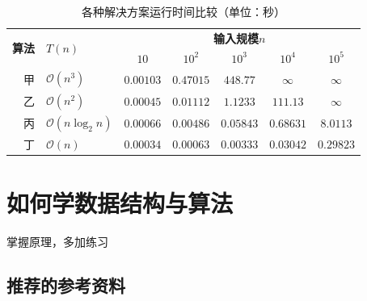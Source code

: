 \begin{fragile}
    \frametitle{\insertsubsectionhead}
    \begin{table}[h]
        \centering
        \caption{各种解决方案运行时间比较（单位：秒）}
        \begin{tabular}{rl|ccccc}
            \toprule
            \multirow{2}{*}{\textbf{算法}} & \multirow{2}{*}{$T(n)$}     & \multicolumn{5}{c}{\textbf{输入规模}$n$}                                                 \\
                                         &                             & $10$                                 & $10^{2}$  & $10^{3}$  & $10^{4}$  & $10^{5}$  \\
            \midrule
            甲                            & $\mathcal{O}(n^{3})$        & $0.00103$                            & $0.47015$ & $448.77$  & $\infty$  & $\infty$  \\
            乙                            & $\mathcal{O}(n^{2})$        & $0.00045$                            & $0.01112$ & $1.1233$  & $111.13$  & $\infty$  \\
            丙                            & $\mathcal{O}(n\log_{2}{n})$ & $0.00066$                            & $0.00486$ & $0.05843$ & $0.68631$ & $8.0113$  \\
            丁                            & $\mathcal{O}(n)$            & $0.00034$                            & $0.00063$ & $0.00333$ & $0.03042$ & $0.29823$ \\
            \bottomrule
        \end{tabular}
        \label{tab:max_subsequence_sum_timing}
    \end{table}
\end{fragile}

\section{如何学数据结构与算法}

\begin{standout}[\insertsubsectionhead]
    掌握原理，多加练习
\end{standout}

\subsection{推荐的参考资料}

